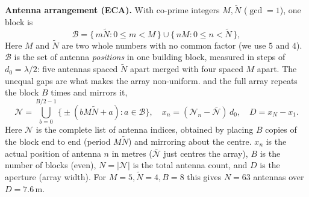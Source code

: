\documentclass[11pt]{article}
\begin{document}
\noindent\textbf{Antenna arrangement (ECA).} With co-prime integers $M,\tilde N$ ($\gcd=1$), one
block is
\begin{equation}
\mathcal{B}=\{\,m\tilde N:0\!\le\! m\!<\!M\,\}\cup\{\,n M:0\!\le\! n\!<\!\tilde N\,\},
\label{eq:block}
\end{equation}
%
{Here $M$ and $\tilde N$ are two whole numbers with no common factor (we use $5$ and $4$).
$\mathcal{B}$ is the set of antenna \emph{positions} in one building block, measured in steps of
$d_{0}=\lambda/2$: five antennas spaced $\tilde N$ apart merged with four spaced $M$ apart. The
unequal gaps are what makes the array non-uniform.}
and the full array repeats the block $B$ times and mirrors it,
\begin{equation}
\mathcal{N}=\!\!\bigcup_{b=0}^{B/2-1}\!\!\big\{\pm(bM\tilde N+a):a\in\mathcal{B}\big\},\quad
x_{n}=(\mathcal{N}_{n}-\bar{\mathcal N})\,d_{0},\quad D=x_{N}-x_{1}.
\label{eq:eca}
\end{equation}
%
{Here $\mathcal{N}$ is the complete list of antenna indices, obtained by placing $B$ copies of the
block end to end (period $M\tilde N$) and mirroring about the centre. $x_{n}$ is the actual position
of antenna $n$ in metres ($\bar{\mathcal N}$ just centres the array), $B$ is the number of blocks
(even), $N=|\mathcal{N}|$ is the total antenna count, and $D$ is the aperture (array width). For
$M=5,\tilde N=4,B=8$ this gives $N=63$ antennas over $D=7.6$\,m.}
\end{document}
